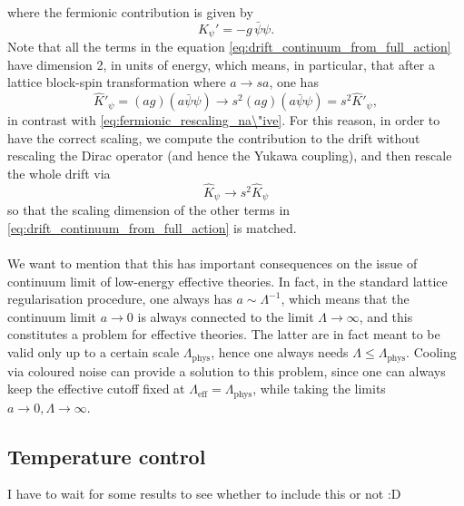 where the fermionic contribution is given by
\begin{equation*}
    K_{\psi}' = - g \, \bar\psi\psi.
\end{equation*}
Note that all the terms in the equation \eqref{eq:drift_continuum_from_full_action} have dimension 2, in units of energy, which means, in particular, that after a lattice block-spin transformation where $a \to sa$, one has
\begin{equation}
    \widehat{K}'_\psi = (ag) (a\bar\psi \psi) \to s^2 (ag) (a\bar\psi \psi) = s^2 \widehat{K}'_\psi,
    \label{eq:rescaling_blinear}
\end{equation}
in contrast with \eqref{eq:fermionic_rescaling_na\"ive}. For this reason, in order to have the correct scaling, we compute the contribution to the drift without rescaling the Dirac operator (and hence the Yukawa coupling), and then rescale the whole drift via 
\begin{equation*}
    \widehat{K}_\psi \to s^2 \widehat{K}_\psi
\end{equation*}
so that the scaling dimension of the other terms in \eqref{eq:drift_continuum_from_full_action} is matched. \\~\\
We want to mention that this has important consequences on the issue of continuum limit of low-energy effective theories. In fact, in the standard lattice regularisation procedure, one always has $a \sim \Lambda^{-1}$, which means that the continuum limit $a \to 0$ is always connected to the limit $\Lambda \to \infty$, and this constitutes a problem for effective theories. The latter are in fact meant to be valid only up to a certain scale $\Lambda_\text{phys}$, hence one always needs $\Lambda \leq \Lambda_\text{phys}$. Cooling via coloured noise can provide a solution to this problem, since one can always keep the effective cutoff fixed at $\Lambda_\text{eff} = \Lambda_\text{phys}$, while taking the limits $a \to 0, \Lambda \to \infty$. 

\subsection*{Temperature control}
I have to wait for some results to see whether to include this or not :D